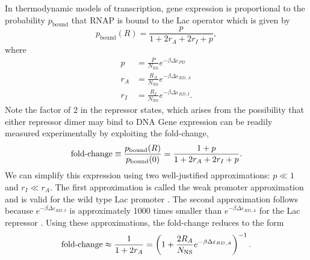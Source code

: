 In thermodynamic models of transcription, gene expression is proportional to the
probability $p_{\text{bound}}$ that RNAP is bound to the Lac operator which is
given by
\begin{equation}\label{eq2}
p_{\text{bound}}(R)=\frac{p}{1+2r_A+2r_I+p},
\end{equation}
where
\begin{align}
p &= \frac{P}{N_{\text{NS}}}e^{-\beta  \Delta\varepsilon_{PD}} \\
r_A &= \frac{R_A}{N_{\text{NS}}}e^{-\beta \Delta\varepsilon_{RD,A}} \\
r_I &= \frac{R_I}{N_{\text{NS}}}e^{-\beta  \Delta\varepsilon_{RD,I}}.
\end{align}
Note the factor of 2 in the repressor states, which arises from the possibility
that either repressor dimer may bind to DNA  Gene expression can be readily
measured experimentally by exploiting the fold-change,
\begin{equation}\label{eq3}
\operatorname{fold-change}\equiv \frac{p_{\text{bound}}(R)}{p_{\text{bound}}(0)}=\frac{1+p}{1+2r_A+2r_I+p}.
\end{equation}
We can simplify this expression using two well-justified approximations: \(p\ll
1\) and \(r_I\ll r_A\). The first approximation is called the weak promoter
approximation and is valid for the wild type Lac promoter \cite{Brewster2012} .
The second approximation follows because $e^{-\beta  \Delta\varepsilon_{RD,I}}$ is
approximately 1000 times smaller than $e^{-\beta \Delta\varepsilon_{RD,A}}$ for
the Lac repressor \cite{Daber2011a}. Using these approximations, the fold-change
reduces to the form
\begin{equation}\label{eq4}
\operatorname{fold-change}\approx \frac{1}{1+2r_A}=\left(1+\frac{2R_A}{N_{\text{NS}}}e^{-\beta  \Delta\varepsilon_{RD,A}}\right)^{-1}.
\end{equation}

